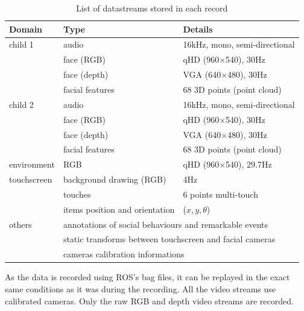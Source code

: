 \documentclass{article}
\begin{document}
\begin{table}[]
\centering
\caption{List of datastreams stored in each record}
\label{table|datastreams}
\begin{tabular}{@{}lll@{}}
\toprule
\bf Domain  & \bf Type                              & \bf Details                          \\ \midrule
child 1     & audio                                 & 16kHz, mono, semi-directional        \\
            & face (RGB)                            & qHD (960$\times$540), 30Hz           \\
            & face (depth)                          & VGA (640$\times$480), 30Hz           \\
            & facial features                       & 68 3D points (point cloud)           \\ \midrule
child 2     & audio                                 & 16kHz, mono, semi-directional        \\
            & face (RGB)                            & qHD (960$\times$540), 30Hz           \\
            & face (depth)                          & VGA (640$\times$480), 30Hz           \\
            & facial features                       & 68 3D points (point cloud)           \\ \midrule
environment & RGB                                   & qHD (960$\times$540), 29.7Hz         \\ \midrule
touchscreen & background drawing (RGB)              & 4Hz                                  \\
            & touches                               & 6 points multi-touch                 \\
            & items position and orientation        & ($x,y,\theta$)                       \\ \midrule
others      & \multicolumn{2}{l}{annotations of social behaviours and remarkable events}   \\
            & \multicolumn{2}{l}{static transforms between touchscreen and facial cameras} \\
            & \multicolumn{2}{l}{cameras calibration informations}                         \\ \bottomrule
\end{tabular}
\end{table}

As the data is recorded using ROS's bag files, it can be replayed in the exact
same conditions as it was during the recording. All the video streams use
calibrated cameras. Only the raw RGB and depth video streams are recorded. 
\end{document}
